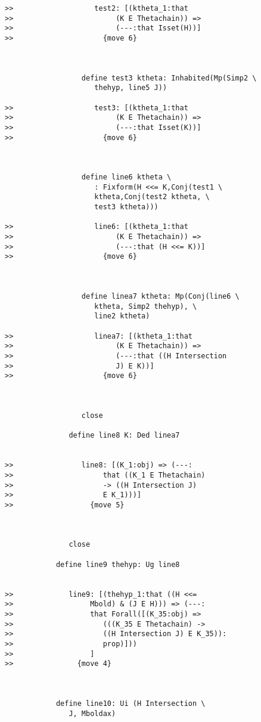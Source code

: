 \documentclass[12pt]{article}
\begin{document}
\begin{verbatim}
>>                   test2: [(ktheta_1:that
>>                        (K E Thetachain)) =>
>>                        (---:that Isset(H))]
>>                     {move 6}



                  define test3 ktheta: Inhabited(Mp(Simp2 \
                     thehyp, line5 J))

>>                   test3: [(ktheta_1:that
>>                        (K E Thetachain)) =>
>>                        (---:that Isset(K))]
>>                     {move 6}



                  define line6 ktheta \
                     : Fixform(H <<= K,Conj(test1 \
                     ktheta,Conj(test2 ktheta, \
                     test3 ktheta)))

>>                   line6: [(ktheta_1:that
>>                        (K E Thetachain)) =>
>>                        (---:that (H <<= K))]
>>                     {move 6}



                  define linea7 ktheta: Mp(Conj(line6 \
                     ktheta, Simp2 thehyp), \
                     line2 ktheta)

>>                   linea7: [(ktheta_1:that
>>                        (K E Thetachain)) =>
>>                        (---:that ((H Intersection
>>                        J) E K))]
>>                     {move 6}



                  close

               define line8 K: Ded linea7


>>                line8: [(K_1:obj) => (---:
>>                     that ((K_1 E Thetachain)
>>                     -> ((H Intersection J)
>>                     E K_1)))]
>>                  {move 5}



               close

            define line9 thehyp: Ug line8


>>             line9: [(thehyp_1:that ((H <<=
>>                  Mbold) & (J E H))) => (---:
>>                  that Forall([(K_35:obj) =>
>>                     (((K_35 E Thetachain) ->
>>                     ((H Intersection J) E K_35)):
>>                     prop)]))
>>                  ]
>>               {move 4}



            define line10: Ui (H Intersection \
               J, Mboldax)


\end{verbatim}
\end{document}
